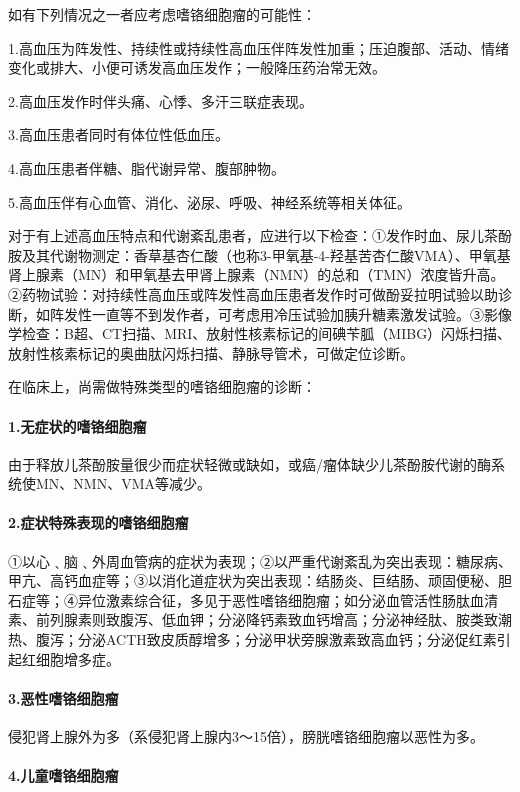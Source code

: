 如有下列情况之一者应考虑嗜铬细胞瘤的可能性：

1.高血压为阵发性、持续性或持续性高血压伴阵发性加重；压迫腹部、活动、情绪变化或排大、小便可诱发高血压发作；一般降压药治常无效。

2.高血压发作时伴头痛、心悸、多汗三联症表现。

3.高血压患者同时有体位性低血压。

4.高血压患者伴糖、脂代谢异常、腹部肿物。

5.高血压伴有心血管、消化、泌尿、呼吸、神经系统等相关体征。

对于有上述高血压特点和代谢紊乱患者，应进行以下检查：①发作时血、尿儿茶酚胺及其代谢物测定：香草基杏仁酸（也称3-甲氧基-4-羟基苦杏仁酸VMA）、甲氧基肾上腺素（MN）和甲氧基去甲肾上腺素（NMN）的总和（TMN）浓度皆升高。②药物试验：对持续性高血压或阵发性高血压患者发作时可做酚妥拉明试验以助诊断，如阵发性一直等不到发作者，可考虑用冷压试验加胰升糖素激发试验。③影像学检查：B超、CT扫描、MRI、放射性核素标记的间碘苄胍（MIBG）闪烁扫描、放射性核素标记的奥曲肽闪烁扫描、静脉导管术，可做定位诊断。

在临床上，尚需做特殊类型的嗜铬细胞瘤的诊断：

\paragraph{1.无症状的嗜铬细胞瘤}

由于释放儿茶酚胺量很少而症状轻微或缺如，或癌/瘤体缺少儿茶酚胺代谢的酶系统使MN、NMN、VMA等减少。

\paragraph{2.症状特殊表现的嗜铬细胞瘤}

①以心﹑脑﹑外周血管病的症状为表现；②以严重代谢紊乱为突出表现：糖尿病、甲亢、高钙血症等；③以消化道症状为突出表现：结肠炎、巨结肠、顽固便秘、胆石症等；④异位激素综合征，多见于恶性嗜铬细胞瘤；如分泌血管活性肠肽血清素、前列腺素则致腹泻、低血钾；分泌降钙素致血钙增高；分泌神经肽、胺类致潮热、腹泻；分泌ACTH致皮质醇增多；分泌甲状旁腺激素致高血钙；分泌促红素引起红细胞增多症。

\paragraph{3.恶性嗜铬细胞瘤}

侵犯肾上腺外为多（系侵犯肾上腺内3～15倍），膀胱嗜铬细胞瘤以恶性为多。

\paragraph{4.儿童嗜铬细胞瘤}

